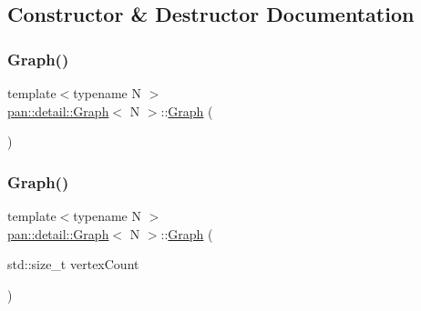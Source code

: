 \subsection{Constructor \& Destructor Documentation}
\mbox{\label{classpan_1_1detail_1_1_graph_a162f4615aa554b1455e54234108da5e6}} 
\subsubsection{\texorpdfstring{Graph()}{Graph()}\hspace{0.1cm}{\footnotesize\ttfamily [1/4]}}
{\footnotesize\ttfamily template$<$typename N $>$ \\
\hyperlink{classpan_1_1detail_1_1_graph}{pan\+::detail\+::\+Graph}$<$ N $>$\+::\hyperlink{classpan_1_1detail_1_1_graph}{Graph} (\begin{DoxyParamCaption}{ }\end{DoxyParamCaption})}

\mbox{\label{classpan_1_1detail_1_1_graph_ac4d4d53acd9e6637ade9c3f026fd63d6}} 
\subsubsection{\texorpdfstring{Graph()}{Graph()}\hspace{0.1cm}{\footnotesize\ttfamily [2/4]}}
{\footnotesize\ttfamily template$<$typename N $>$ \\
\hyperlink{classpan_1_1detail_1_1_graph}{pan\+::detail\+::\+Graph}$<$ N $>$\+::\hyperlink{classpan_1_1detail_1_1_graph}{Graph} (\begin{DoxyParamCaption}\item[{std\+::size\+\_\+t}]{vertex\+Count }\end{DoxyParamCaption})\hspace{0.3cm}{\ttfamily [explicit]}}

\mbox{\label{classpan_1_1detail_1_1_graph_a33d07cc94ec5936885da57f01e151253}} 
